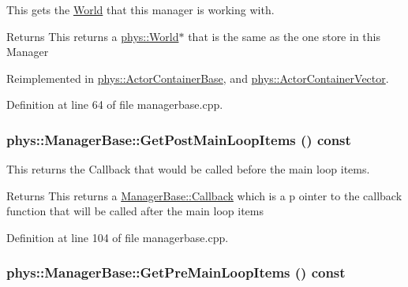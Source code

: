 This gets the \hyperlink{classphys_1_1World}{World} that this manager is working with. 

\begin{DoxyReturn}{Returns}
This returns a \hyperlink{classphys_1_1World}{phys::World}$\ast$ that is the same as the one store in this Manager 
\end{DoxyReturn}


Reimplemented in \hyperlink{classphys_1_1ActorContainerBase_a479e6c7434f2611b0cfe6ca1fd4ebdd1}{phys::ActorContainerBase}, and \hyperlink{classphys_1_1ActorContainerVector_a5519eb0000073a2f397e158bfc368349}{phys::ActorContainerVector}.



Definition at line 64 of file managerbase.cpp.

\hypertarget{classphys_1_1ManagerBase_a1e541b261e5747ebcfcefdd3dcff78ce}{
\subsubsection[{GetPostMainLoopItems}]{ phys::ManagerBase::GetPostMainLoopItems () const}}
\label{d2/de3/classphys_1_1ManagerBase_a1e541b261e5747ebcfcefdd3dcff78ce}


This returns the Callback that would be called before the main loop items. 

\begin{DoxyReturn}{Returns}
This returns a \hyperlink{classphys_1_1ManagerBase_a753f5f0127131529767beab2502f480b}{ManagerBase::Callback} which is a p ointer to the callback function that will be called after the main loop items 
\end{DoxyReturn}


Definition at line 104 of file managerbase.cpp.

\hypertarget{classphys_1_1ManagerBase_a02a92b0d5df8b8b877822bdf57ec8ffc}{
\subsubsection[{GetPreMainLoopItems}]{ phys::ManagerBase::GetPreMainLoopItems () const}}
\label{d2/de3/classphys_1_1ManagerBase_a02a92b0d5df8b8b877822bdf57ec8ffc}


